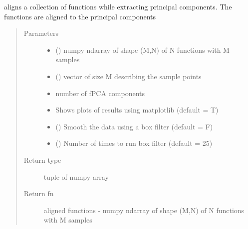 \documentclass[letterpaper,10pt,english]{sphinxmanual}
\begin{document}
\begin{fulllineitems}
\label{\detokenize{time_warping:time_warping.align_fPCA}}
aligns a collection of functions while extracting principal components.
The functions are aligned to the principal components
\begin{quote}\begin{description}
\item[{Parameters}] \leavevmode\begin{itemize}
\item {} 
 () \textendash{} numpy ndarray of shape (M,N) of N functions with M samples

\item {} 
 () \textendash{} vector of size M describing the sample points

\item {} 
 \textendash{} number of fPCA components

\item {} 
 \textendash{} Shows plots of results using matplotlib (default = T)

\item {} 
 () \textendash{} Smooth the data using a box filter (default = F)

\item {} 
 () \textendash{} Number of times to run box filter (default = 25)

\end{itemize}

\item[{Return type}] \leavevmode
tuple of numpy array

\item[{Return fn}] \leavevmode
aligned functions - numpy ndarray of shape (M,N) of N
functions with M samples


\end{description}
\end{quote}
\end{fulllineitems}
\end{document}
